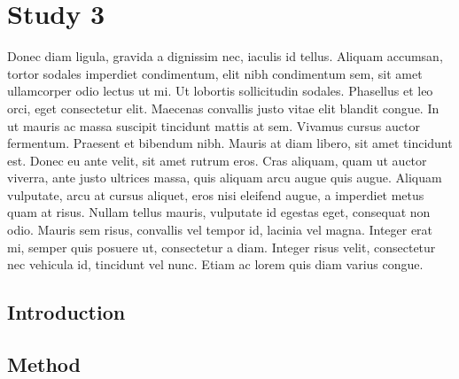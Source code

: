 \chapter{Study 3}
\label{ch:study3}

\newpage
Donec diam ligula, gravida a dignissim nec, iaculis id tellus. Aliquam accumsan, tortor sodales imperdiet condimentum, elit nibh condimentum sem, sit amet ullamcorper odio lectus ut mi. Ut lobortis sollicitudin sodales. Phasellus et leo orci, eget consectetur elit. Maecenas convallis justo vitae elit blandit congue. In ut mauris ac massa suscipit tincidunt mattis at sem. Vivamus cursus auctor fermentum. Praesent et bibendum nibh. Mauris at diam libero, sit amet tincidunt est. Donec eu ante velit, sit amet rutrum eros. Cras aliquam, quam ut auctor viverra, ante justo ultrices massa, quis aliquam arcu augue quis augue. Aliquam vulputate, arcu at cursus aliquet, eros nisi eleifend augue, a imperdiet metus quam at risus. Nullam tellus mauris, vulputate id egestas eget, consequat non odio. Mauris sem risus, convallis vel tempor id, lacinia vel magna. Integer erat mi, semper quis posuere ut, consectetur a diam. Integer risus velit, consectetur nec vehicula id, tincidunt vel nunc. Etiam ac lorem quis diam varius congue.

\section{Introduction}
\label{study3:intro}
\lorem
\lorem
\lorem
\lorem


\section{Method}
\label{study3:method}
